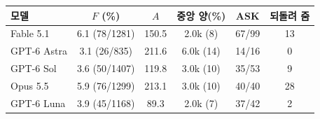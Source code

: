 \setlength{\tabcolsep}{2.4pt}
\small
\begin{tabular}{@{}lccccc@{}}
\toprule
모델 & $F$ (\%) & $A$ & 중앙 양(\%) & ASK & 되돌려 줌 \\
\midrule
Fable 5.1 & 6.1 (78/1281) & 150.5 & 2.0k (8) & 67/99 & 13 \\
GPT-6 Astra & 3.1 (26/835) & 211.6 & 6.0k (14) & 14/16 & 0 \\
GPT-6 Sol & 3.6 (50/1407) & 119.8 & 3.0k (10) & 35/53 & 9 \\
Opus 5.5 & 5.9 (76/1299) & 213.1 & 3.0k (10) & 40/40 & 28 \\
GPT-6 Luna & 3.9 (45/1168) & 89.3 & 2.0k (7) & 37/42 & 2 \\
\bottomrule
\end{tabular}
